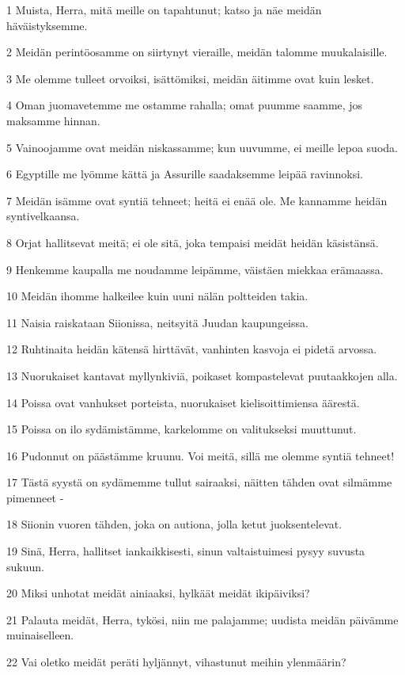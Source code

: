 \par 1 Muista, Herra, mitä meille on tapahtunut; katso ja näe meidän häväistyksemme.
\par 2 Meidän perintöosamme on siirtynyt vieraille, meidän talomme muukalaisille.
\par 3 Me olemme tulleet orvoiksi, isättömiksi, meidän äitimme ovat kuin lesket.
\par 4 Oman juomavetemme me ostamme rahalla; omat puumme saamme, jos maksamme hinnan.
\par 5 Vainoojamme ovat meidän niskassamme; kun uuvumme, ei meille lepoa suoda.
\par 6 Egyptille me lyömme kättä ja Assurille saadaksemme leipää ravinnoksi.
\par 7 Meidän isämme ovat syntiä tehneet; heitä ei enää ole. Me kannamme heidän syntivelkaansa.
\par 8 Orjat hallitsevat meitä; ei ole sitä, joka tempaisi meidät heidän käsistänsä.
\par 9 Henkemme kaupalla me noudamme leipämme, väistäen miekkaa erämaassa.
\par 10 Meidän ihomme halkeilee kuin uuni nälän poltteiden takia.
\par 11 Naisia raiskataan Siionissa, neitsyitä Juudan kaupungeissa.
\par 12 Ruhtinaita heidän kätensä hirttävät, vanhinten kasvoja ei pidetä arvossa.
\par 13 Nuorukaiset kantavat myllynkiviä, poikaset kompastelevat puutaakkojen alla.
\par 14 Poissa ovat vanhukset porteista, nuorukaiset kielisoittimiensa äärestä.
\par 15 Poissa on ilo sydämistämme, karkelomme on valitukseksi muuttunut.
\par 16 Pudonnut on päästämme kruunu. Voi meitä, sillä me olemme syntiä tehneet!
\par 17 Tästä syystä on sydämemme tullut sairaaksi, näitten tähden ovat silmämme pimenneet -
\par 18 Siionin vuoren tähden, joka on autiona, jolla ketut juoksentelevat.
\par 19 Sinä, Herra, hallitset iankaikkisesti, sinun valtaistuimesi pysyy suvusta sukuun.
\par 20 Miksi unhotat meidät ainiaaksi, hylkäät meidät ikipäiviksi?
\par 21 Palauta meidät, Herra, tykösi, niin me palajamme; uudista meidän päivämme muinaiselleen.
\par 22 Vai oletko meidät peräti hyljännyt, vihastunut meihin ylenmäärin?


